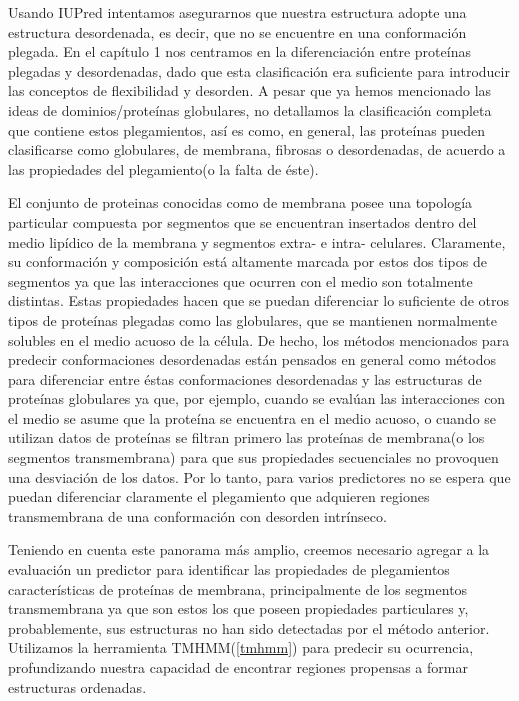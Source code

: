 Usando IUPred intentamos asegurarnos que nuestra estructura adopte una estructura desordenada, es decir, que no se encuentre en una conformación plegada.
En el capítulo 1 nos centramos en la diferenciación entre proteínas plegadas y desordenadas, dado que esta clasificación era suficiente para introducir las conceptos de flexibilidad y desorden.
A pesar que ya hemos mencionado las ideas de dominios/proteínas globulares, no detallamos la clasificación completa que contiene estos plegamientos, así es como, en general,
las proteínas pueden clasificarse como globulares, de membrana, fibrosas o desordenadas, de acuerdo a las propiedades del plegamiento(o la falta de éste).

El conjunto de proteinas conocidas como de membrana posee una topología particular compuesta por segmentos que se encuentran insertados dentro del medio lipídico de la membrana y segmentos extra- e intra- celulares.
Claramente, su conformación y composición está altamente marcada por estos dos tipos de segmentos ya que las interacciones que ocurren con el medio son totalmente distintas. 
Estas propiedades hacen que se puedan diferenciar lo suficiente de otros tipos de proteínas plegadas como las globulares, que se mantienen normalmente solubles en el medio acuoso de la célula. 
De hecho, los métodos mencionados para predecir conformaciones desordenadas están pensados en general como métodos para diferenciar entre éstas conformaciones desordenadas y las estructuras de proteínas globulares ya que,
por ejemplo, cuando se evalúan las interacciones con el medio se asume que la proteína se encuentra en el medio acuoso, o cuando se utilizan datos de proteínas se filtran primero las proteínas de membrana(o los segmentos transmembrana) 
para que sus propiedades secuenciales no provoquen una desviación de los datos. 
Por lo tanto, para varios predictores no se espera que puedan diferenciar claramente el plegamiento que adquieren regiones transmembrana de una conformación con desorden intrínseco.

Teniendo en cuenta este panorama más amplio, creemos necesario agregar a la evaluación un predictor para identificar las propiedades de plegamientos características de proteínas de membrana,
principalmente de los segmentos transmembrana ya que son estos los que poseen propiedades particulares y, probablemente, sus estructuras no han sido detectadas por el método anterior.
Utilizamos la herramienta TMHMM(\ref{tmhmm}) para predecir su ocurrencia, profundizando nuestra capacidad de encontrar regiones propensas a formar estructuras ordenadas.


